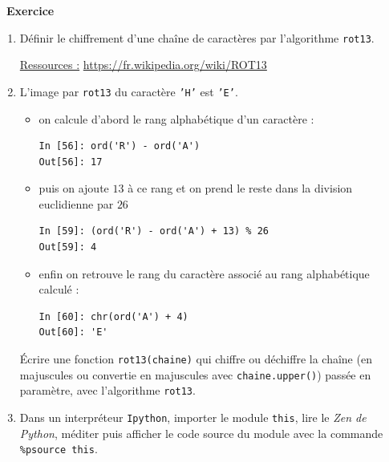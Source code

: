 \documentclass[a4paper, french, 12pt]{article}  %
\newcounter{exo}
\newenvironment{exercice}[1]
{\par \medskip   \addtocounter{exo}{1} \noindent  
\begin{bclogo}[arrondi =0.1,   noborder = true, logo=\bccrayon, marge=4]{~\textbf{Exercice} \textbf{\theexo} {\itshape #1} }  \par}
{
\end{bclogo}
 \par \bigskip }
\newcounter{thme}
\newcounter{alg}
\newlength{\parpointille}
\newcommand{\Pointilles}[2]{%
\multido{}{#1}{%
\makebox[#2]{\dotfill}\\[\parpointille]
}}
\begin{document}




\begin{exercice}{}


\begin{enumerate}
	\item Définir le chiffrement d'une chaîne de caractères par l'algorithme \texttt{rot13}.
	
	\uline{Ressources :} \url{https://fr.wikipedia.org/wiki/ROT13}


    \Pointilles{2}{\linewidth}
    
    
\item L'image par \texttt{rot13} du caractère \texttt{'H'} est \texttt{'E'}.

\begin{itemize}
\item on  calcule d'abord le rang alphabétique d'un caractère :

\begin{lstlisting}
In [56]: ord('R') - ord('A')
Out[56]: 17
\end{lstlisting}

\item puis on ajoute $13$ à ce rang et on prend le reste dans la division euclidienne par $26$
\begin{lstlisting}
In [59]: (ord('R') - ord('A') + 13) % 26
Out[59]: 4
\end{lstlisting}

\vspace*{-10pt}

\item enfin on retrouve le rang du caractère associé au rang alphabétique calculé :
\begin{lstlisting}
In [60]: chr(ord('A') + 4)
Out[60]: 'E'
\end{lstlisting}
\end{itemize}

Écrire une   fonction \texttt{rot13(chaine)} qui chiffre ou déchiffre la chaîne (en majuscules ou convertie en majuscules avec \texttt{chaine.upper()}) passée en paramètre, avec l'algorithme \texttt{rot13}.


    \Pointilles{5}{\linewidth}
    
\item Dans un interpréteur \texttt{Ipython}, importer le module \texttt{this}, lire le \textit{Zen de Python}, méditer  puis afficher le code source du module avec la commande \texttt{\%psource this}.
    
\end{enumerate}

\end{exercice}
\end{document}
